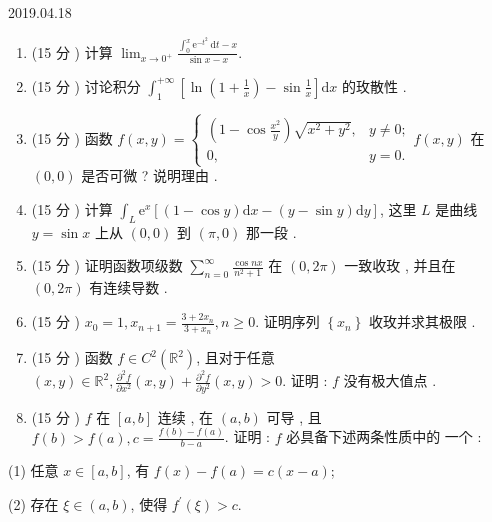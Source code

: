 \documentclass[10pt]{article}
\begin{document}
2019.04.18

\begin{enumerate}
  \item (15  分 )  计算  $\lim _{x \rightarrow 0^{+}} \frac{\int_{0}^{x} \mathrm{e}^{-t^{2}} \mathrm{~d} t-x}{\sin x-x}$.

  \item (15  分 )  讨论积分  $\int_{1}^{+\infty}\left[\ln \left(1+\frac{1}{x}\right)-\sin \frac{1}{x}\right] \mathrm{d} x$  的玫散性 .

  \item (15  分 )  函数  $f(x, y)=\left\{\begin{array}{ll}\left(1-\cos \frac{x^{2}}{y}\right) \sqrt{x^{2}+y^{2}}, & y \neq 0 ; \\ 0, & y=0 .\end{array} f(x, y)\right.$  在  $(0,0)$  是否可微 ?  说明理由 .

  \item (15  分 )  计算  $\int_{L} \mathrm{e}^{x}[(1-\cos y) \mathrm{d} x-(y-\sin y) \mathrm{d} y]$,  这里  $L$  是曲线  $y=\sin x$  上从  $(0,0)$  到  $(\pi, 0)$  那一段 .

  \item (15  分 )  证明函数项级数  $\sum_{n=0}^{\infty} \frac{\cos n x}{n^{2}+1}$  在  $(0,2 \pi)$  一致收玫 ,  并且在  $(0,2 \pi)$  有连续导数 .

  \item (15  分 ) $x_{0}=1, x_{n+1}=\frac{3+2 x_{n}}{3+x_{n}}, n \geqslant 0$.  证明序列  $\left\{x_{n}\right\}$  收玫并求其极限 .

  \item (15  分 )  函数  $f \in C^{2}\left(\mathbb{R}^{2}\right)$,  且对于任意  $(x, y) \in \mathbb{R}^{2}, \frac{\partial^{2} f}{\partial x^{2}}(x, y)+\frac{\partial^{2} f}{\partial y^{2}}(x, y)>0$.  证明 : $f$  没有极大值点 .

  \item (15  分 ) $f$  在  $[a, b]$  连续 ,  在  $(a, b)$  可导 ,  且  $f(b)>f(a), c=\frac{f(b)-f(a)}{b-a}$.  证明 : $f$  必具备下述两条性质中的   一个 :

\end{enumerate}
(1)  任意  $x \in[a, b]$,  有  $f(x)-f(a)=c(x-a)$;

(2)  存在  $\xi \in(a, b)$,  使得  $f^{\prime}(\xi)>c$.
\end{document}

